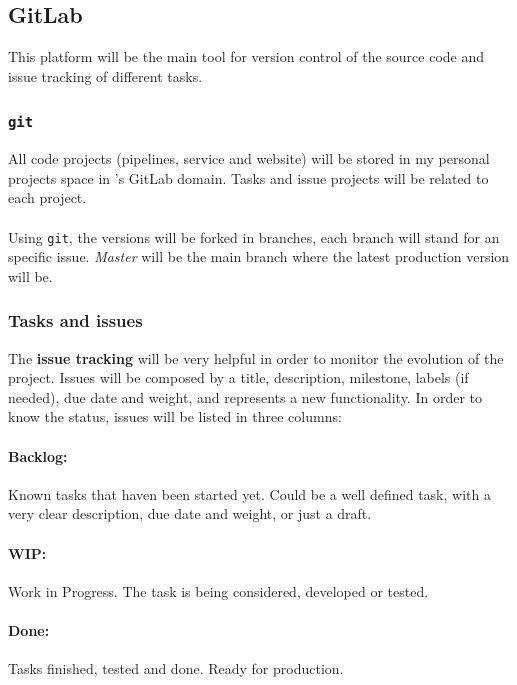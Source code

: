 \subsection{GitLab}

This platform will be the main tool for version control of the source code and issue tracking of different tasks.

\subsubsection*{\texttt{git}}

All code projects (pipelines, service and website) will be stored in my personal projects space in \company's GitLab domain. Tasks and issue projects will be related to each project.
\\\\
Using \texttt{git}, the versions will be forked in branches, each branch will stand for an specific issue. \textit{Master} will be the main branch where the latest production version will be.

\subsubsection*{Tasks and issues}

The \textbf{issue tracking} will be very helpful in order to monitor the evolution of the project. Issues will be composed by a title, description, milestone, labels (if needed), due date and weight, and represents a new functionality. In order to know the status, issues will be listed in three columns:

\paragraph*{Backlog:}

Known tasks that haven been started yet. Could be a well defined task, with a very clear description, due date and weight, or just a draft.

\paragraph*{WIP:}

Work in Progress. The task is being considered, developed or tested.

\paragraph*{Done:}

Tasks finished, tested and done. Ready for production.

